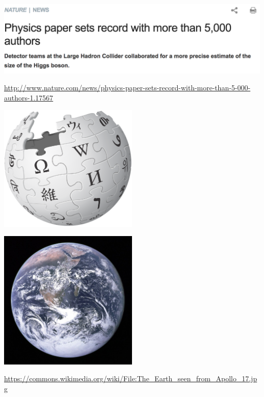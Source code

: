 \documentclass[aspectratio=169]{beamer}
\def\vf{\vfill}
\begin{document}
\begin{frame}

\begin{center}
\includegraphics[width=\textwidth]{figures/castelvecchi_physics_2015_title}
\end{center}

\vf
{\tiny \url{http://www.nature.com/news/physics-paper-sets-record-with-more-than-5-000-authors-1.17567}}

\end{frame}
\begin{frame}

\begin{center}
\includegraphics[width=0.5\textwidth]{figures/wikipedia_logo}
\end{center}

\end{frame}
\begin{frame}

\begin{center}
\includegraphics[width=0.5\textwidth]{figures/blue_marble}
\end{center}

\vf
\tiny{\url{https://commons.wikimedia.org/wiki/File:The_Earth_seen_from_Apollo_17.jpg}}

\end{frame}
\end{document}
